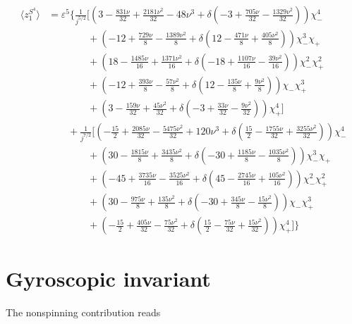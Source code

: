 \documentclass[prd,superscriptaddress,preprintnumbers,tightenlines,nofootinbib, eqsecnum]{revtex4-2}
\newcommand{\nn}{\nonumber}
\begin{document}
\begin{align}
\langle z_1^{S^4} \rangle  &= \varepsilon^5\Bigg\{\frac{1}{j^{5/2}}\Bigg[\left(3-\frac{831\nu}{32}+\frac{2181\nu^2}{32}-48\nu^3+\delta\left(-3+\frac{705\nu}{32}-\frac{1329\nu^2}{32}\right)\right)\chi_{-}^4\nn\\
&\qquad\qquad+\left(-12+\frac{729\nu}{8}-\frac{1389\nu^2}{8}+\delta\left(12-\frac{471\nu}{8}+\frac{405\nu^2}{8}\right)\right)\chi_{-}^3\chi_{+}\nn\\
&\qquad\qquad+\left(18-\frac{1485\nu}{16}+\frac{1371\nu^2}{16}+\delta\left(-18+\frac{1107\nu}{16}-\frac{39\nu^2}{16}\right)\right)\chi_{-}^2\chi_{+}^2\nn\\
&\qquad\qquad+\left(-12+\frac{393\nu}{8}-\frac{57\nu^2}{8}+\delta\left(12-\frac{135\nu}{8}+\frac{9\nu^2}{8}\right)\right)\chi_{-}\chi_{+}^3\nn\\
&\qquad\qquad+\left(3-\frac{159\nu}{32}+\frac{45\nu^2}{32}+\delta\left(-3+\frac{33\nu}{32}-\frac{9\nu^2}{32}\right)\right)\chi_{+}^4\Bigg]\nn\\
&\qquad+\frac{1}{j^{7/2}}\Bigg[\left(-\frac{15}{2}+\frac{2085\nu}{32}-\frac{5475\nu^2}{32}+120\nu^3+\delta\left(\frac{15}{2}-\frac{1755\nu}{32}+\frac{3255\nu^2}{32}\right)\right)\chi_{-}^4 \nn\\
&\qquad\qquad+\left(30-\frac{1815\nu}{8}+\frac{3435\nu^2}{8}+\delta\left(-30+\frac{1185\nu}{8}-\frac{1035\nu^2}{8}\right)\right)\chi_{-}^3\chi_{+}\nn\\
&\qquad\qquad+\left(-45+\frac{3735\nu}{16}-\frac{3525\nu^2}{16}+\delta\left(45-\frac{2745\nu}{16}+\frac{105\nu^2}{16}\right)\right)\chi_{-}^2\chi_{+}^2 \nn \\
&\qquad\qquad+\left(30-\frac{975\nu}{8}+\frac{135\nu^2}{8}+\delta\left(-30+\frac{345\nu}{8}-\frac{15\nu^2}{8}\right)\right)\chi_{-}\chi_{+}^3 \nn\\
&\qquad\qquad +\left(-\frac{15}{2}+\frac{405\nu}{32}-\frac{75\nu^2}{32}+\delta\left(\frac{15}{2}-\frac{75\nu}{32}+\frac{15\nu^2}{32}\right)\right)\chi_{+}^4\Bigg]\Bigg\}
\end{align}



\section{Gyroscopic invariant}
\label{app:gyroscopic}

The nonspinning contribution reads
\end{document}

